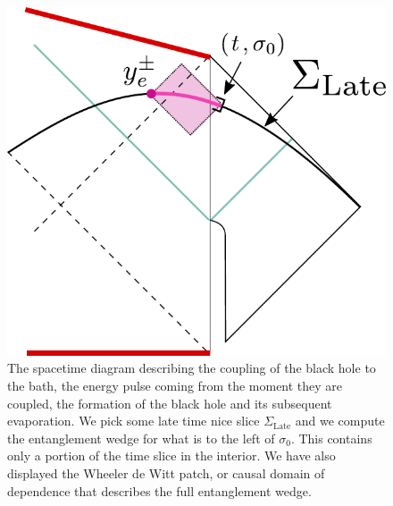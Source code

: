 \documentclass[11pt]{article}
\begin{document}
\begin{figure}[ht]
    \begin{center}
        \includegraphics[scale=.5]{Figures/latetimeslice}
    \end{center}
    \caption{The spacetime diagram describing the coupling of the black hole to the bath, the energy pulse coming from the moment they are coupled, the formation of the black hole and its subsequent evaporation. We pick some late time nice slice $\Sigma_{\text{Late}} $ and we compute the entanglement wedge for what is to the left of $\sigma_0$. This contains only a portion of the time slice in the interior. We have also displayed the Wheeler de Witt patch, or causal domain of dependence that describes the full entanglement wedge.    }
    \label{latetimeslice}
\end{figure}
\end{document}
